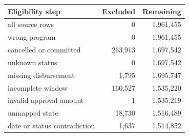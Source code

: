 \begingroup\small\setlength{\tabcolsep}{3pt}
\begin{tabularx}{\linewidth}{Xrr}\toprule
Eligibility step & Excluded & Remaining \\ \midrule
all source rows & 0 & 1,961,455 \\
wrong program & 0 & 1,961,455 \\
cancelled or committed & 263,913 & 1,697,542 \\
unknown status & 0 & 1,697,542 \\
missing disbursement & 1,795 & 1,695,747 \\
incomplete window & 160,527 & 1,535,220 \\
invalid approval amount & 1 & 1,535,219 \\
unmapped state & 18,730 & 1,516,489 \\
date or status contradiction & 1,637 & 1,514,852 \\
\bottomrule\end{tabularx}\endgroup
